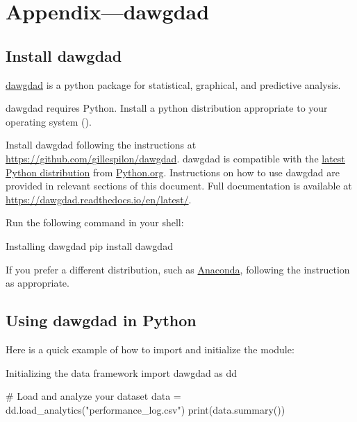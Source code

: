 \chapter{Appendix---dawgdad}
\label{app:dawgdad}

\section{Install dawgdad}\label{sec:install_dawgdad}

\href{https://github.com/gillespilon/dawgdad}{dawgdad} \cite{dawgdad} is a \Gls{python} package for statistical, graphical, and predictive analysis.

dawgdad requires Python. Install a \Gls{python} distribution appropriate to your operating system ().

Install dawgdad following the instructions  at \href{https://github.com/gillespilon/dawgdad}{https://github.com/gillespilon/dawgdad}. dawgdad is compatible with the \href{https://www.python.org/downloads/}{latest Python distribution} from \href{https://www.python.org/}{Python.org}. Instructions on how to use dawgdad are provided in relevant sections of this document. Full documentation is available at \href{https://dawgdad.readthedocs.io/en/latest/}{https://dawgdad.readthedocs.io/en/latest/}.

Run the following command in your shell:

\begin{zshbox}{Installing dawgdad}
pip install dawgdad
\end{zshbox}

If you prefer a different distribution, such as \href{https://www.anaconda.com/download}{Anaconda}, following the instruction as appropriate.

\section{Using dawgdad in Python}\label{sec:using_dawdad_in_python}

Here is a quick example of how to import and initialize the module:

\begin{pycode}{Initializing the data framework}
import dawgdad as dd

# Load and analyze your dataset
data = dd.load_analytics("performance_log.csv")
print(data.summary())
\end{pycode}
